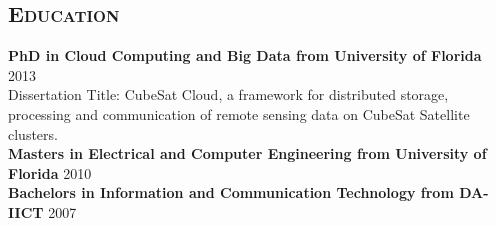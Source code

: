 \begin{resume}
\section{\textsc{Education}}
\textbf{PhD in Cloud Computing and Big Data from University of Florida} \hfill 2013 \\
Dissertation Title: CubeSat Cloud, a framework for distributed storage, processing and communication of remote sensing data on CubeSat Satellite clusters.\\
\textbf{Masters in Electrical and Computer Engineering from University of Florida} \hfill 2010 \\
\textbf{Bachelors in Information and Communication Technology from DA-IICT} \hfill 2007

\begin{formatb}
  \\
  \body\\
\end{formatb}


\end{resume}
